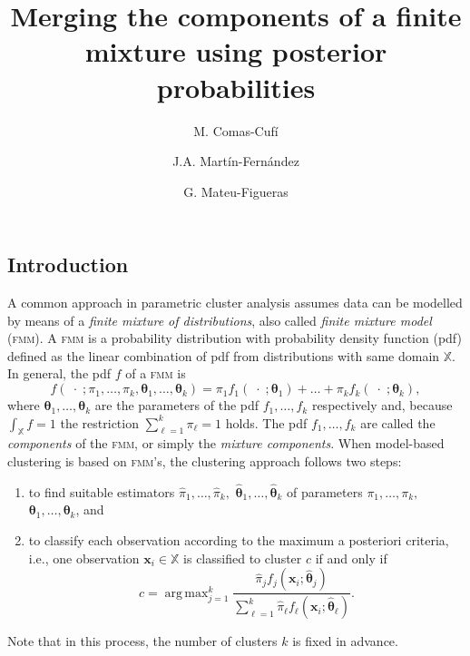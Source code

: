 \documentclass[10pt, a4paper]{article}
\title{Merging the components of a finite mixture using  posterior probabilities}
\author{M. Comas-Cufí \and J.A. Martín-Fernández \and G. Mateu-Figueras}
\DeclareMathOperator*{\argmax}{arg\,max}
\newcommand{\m}[1]{\boldsymbol{#1}}
\newcommand{\fmm}{\textsc{fmm}\xspace}
\begin{document}
\begin{spacing}{1.9}



\maketitle

\section{Introduction}


A common approach in parametric cluster analysis assumes data can be modelled by means of a \emph{finite mixture of distributions}, also called \emph{finite mixture model} (\fmm). A \fmm is a probability distribution with probability density function (pdf) defined as the linear combination of pdf from distributions with same domain $\mathbb{X}$. In general, the pdf $f$ of a \fmm is
\begin{equation}\label{mixt}
f(\;\cdot\; ; \pi_1, \dots, \pi_k, \m\theta_1, \dots, \m\theta_k) = \pi_1 f_1(\;\cdot\; ; \m\theta_1) + \dots + \pi_k f_k(\;\cdot\; ; \m\theta_k),
\end{equation}
where $\m\theta_1, \dots,  \m\theta_k$ are the parameters of the pdf $f_1, \dots, f_k$ respectively and, because $\int_{\mathbb{X}}f = 1$ the restriction $\sum_{\ell = 1}^k \pi_\ell = 1$ holds. The pdf $f_1, \dots, f_k$ are called the \emph{components} of the \fmm, or simply the \emph{mixture components}. When model-based clustering is based on \fmm's, the clustering approach follows two steps:
\begin{enumerate}
\item to find suitable estimators $\hat{\pi}_1, \dots, \hat{\pi}_k,$ $\hat{\m\theta}_1, \dots, \hat{\m\theta}_k$ of parameters $\pi_1, \dots, \pi_k,$ $\m\theta_1, \dots, \m\theta_k$, and
\item to classify each observation according to the maximum a posteriori criteria, i.e., one observation $\m x_i \in \mathbb{X}$ is classified to cluster $c$ if and only if
\begin{equation}\label{map_criteria}
c=\argmax_{j=1}^k \frac{ \hat{\pi}_j f_j(\m x_i ; \hat{\m\theta}_j) }{\sum_{\ell=1}^k \hat{\pi}_\ell f_\ell(\m x_i ; \hat{\m\theta}_\ell) }.
\end{equation}
\end{enumerate}
Note that in this process, the number of clusters $k$ is fixed in advance. 


\end{spacing}
\end{document}
